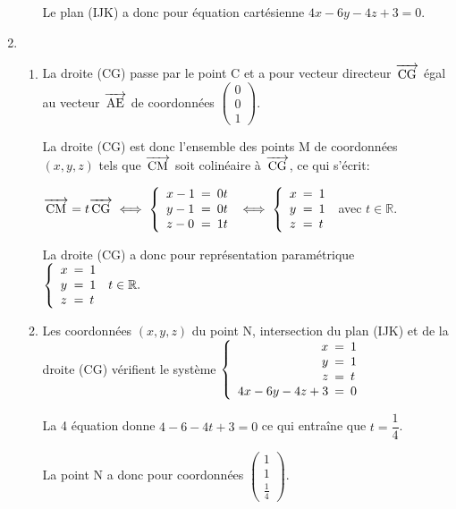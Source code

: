 \documentclass[10pt]{article}
\newcommand{\R}{\mathbb{R}}
\newcommand{\vect}[1]{\overrightarrow{\,\mathstrut#1\,}}
\begin{document}
\begin{enumerate}
\begin{enumerate}
Le plan (IJK) a donc pour équation cartésienne $4x -6y -4z +3=0$.
		
	\end{enumerate}
\item 
	\begin{enumerate}
		\item %
La droite (CG) passe par le point C et a pour vecteur directeur $\vect{\mathrm{CG}}$ égal au vecteur $\vect{\mathrm{AE}}$ de coordonnées
$ \begin{pmatrix} 0 \\ 0 \\ 1 \end{pmatrix}$.

La droite (CG) est donc l'ensemble des points M de coordonnées $(x,y,z)$ tels que $\vect{\mathrm{CM}}$ soit colinéaire à $\vect{\mathrm{CG}}$, ce qui s'écrit:

$\vect{\mathrm{CM}} = t \vect{\mathrm{CG}}
\iff 
\left \lbrace
\begin{array}{l !{=} l}
x-1 & 0t\\
y-1 & 0t\\
z-0 & 1t
\end{array}
\right .
\iff
\left \lbrace
\begin{array}{l !{=} l}
x & 1\\
y & 1\\
z & t
\end{array}
\right .$ avec $t\in \R$.

La droite (CG) a donc pour représentation paramétrique 
$\left \lbrace
\begin{array}{l !{=} l l}
x & 1\\
y & 1 & t\in \R.\\
z & t
\end{array}
\right .$
		
		\item Les coordonnées $(x,y,z)$ du point N, intersection du plan (IJK) et de la droite (CG) vérifient le système
$\left \lbrace
\begin{array}{r !{=} l}
x & 1\\
y & 1 \\
z & t\\
4x-6y-4z+3 & 0
\end{array}
\right .$	

La 4\ieme{} équation donne $4-6-4t+3=0$ ce qui entraîne que $t=\dfrac{1}{4}$.

La point N a donc pour coordonnées
$\begin{pmatrix} 1 \\ 1 \\ \frac{1}{4}\end{pmatrix}$.
		

\end{enumerate}
\end{enumerate}
\end{document}
